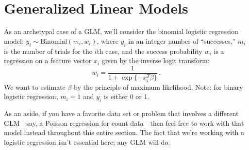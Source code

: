 \documentclass[11 pt]{article}
\begin{document}
\section{Generalized Linear Models}\label{sec:method}

As an archetypal case of a GLM, we'll consider the binomial logistic regression model: $y_i \sim \mbox{Binomial}(m_i, w_i)$, where $y_i$ in an integer number of ``successes,'' $m_i$ is the number of trials for the $i$th case, and the success probability $w_i$ is a regression on a feature vector $x_i$ given by the inverse logit transform:
$$
w_i = \frac{1}{1 + \exp\{-x_i^T \beta\}} \, .
$$
We want to estimate $\beta$ by the principle of maximum likelihood.  Note: for binary logistic regression, $m_i = 1$ and $y_i$ is either 0 or 1.

As an aside, if you have a favorite data set or problem that involves a different GLM---say, a Poisson regression for count data---then feel free to work with that model instead throughout this entire section.  The fact that we're working with a logistic regression isn't essential here; any GLM will do.
\end{document}
